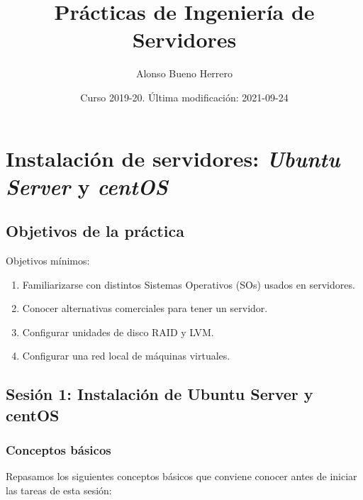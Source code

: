 \documentclass[
]{memoir}
\title{Prácticas de Ingeniería de Servidores}
\author{Alonso Bueno Herrero}
\date{Curso 2019-20. Última modificación: 2021-09-24}
\providecommand{\tightlist}{%
  \setlength{\itemsep}{0pt}\setlength{\parskip}{0pt}}
\begin{document}
\maketitle

{
\setcounter{tocdepth}{1}
\tableofcontents
}
\hypertarget{p1}{%
\chapter{\texorpdfstring{Instalación de servidores: \textbf{\emph{Ubuntu Server}} y \textbf{\emph{centOS}}}{Instalación de servidores: Ubuntu Server y centOS}}\label{p1}}

\hypertarget{objetivos-de-la-pruxe1ctica}{%
\section{Objetivos de la práctica}\label{objetivos-de-la-pruxe1ctica}}

Objetivos mínimos:

\begin{enumerate}
\def\labelenumi{\arabic{enumi}.}
\tightlist
\item
  Familiarizarse con distintos Sistemas Operativos (SOs) usados en servidores.
\item
  Conocer alternativas comerciales para tener un servidor.
\item
  Configurar unidades de disco RAID y LVM.
\item
  Configurar una red local de máquinas virtuales.
\end{enumerate}

\hypertarget{sesiuxf3n-1-instalaciuxf3n-de-ubuntu-server-y-centos}{%
\section{Sesión 1: Instalación de Ubuntu Server y centOS}\label{sesiuxf3n-1-instalaciuxf3n-de-ubuntu-server-y-centos}}

\hypertarget{conceptos-buxe1sicos}{%
\subsection{Conceptos básicos}\label{conceptos-buxe1sicos}}

Repasamos los siguientes conceptos básicos que conviene conocer antes de iniciar las tareas de esta sesión:
\end{document}

